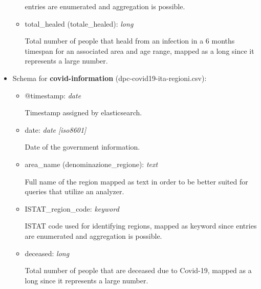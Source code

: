 \documentclass[12pt, a4paper]{article}
\begin{document}
\begin{itemize}
\begin{itemize}
\begin{footnotesize}
          entries are enumerated and aggregation is possible.
        \end{footnotesize}
      \item total\_healed (totale\_healed): \emph{long} \\
        \begin{footnotesize}
          Total number of people that heald from an infection in a 6 months timespan for
          an associated area and age range, mapped as a long since it represents a large 
          number.      
        \end{footnotesize}
    \end{itemize}
  \item Schema for \textbf{covid-information} (dpc-covid19-ita-regioni.csv):
    \begin{itemize}
      \item @timestamp: \emph{date} \\
        \begin{footnotesize}
          Timestamp assigned by elasticsearch.
        \end{footnotesize}
      \item date: \emph{date [iso8601]} \\
        \begin{footnotesize}
          Date of the government information.
        \end{footnotesize}
      \item area\_name (denominazione\_regione): \emph{text} \\
        \begin{footnotesize}
          Full name of the region mapped as text in order to be better suited for queries
          that utilize an analyzer.
        \end{footnotesize}
      \item ISTAT\_region\_code: \emph{keyword} \\
        \begin{footnotesize}
          ISTAT code used for identifying regions, mapped as keyword since entries are 
          enumerated and aggregation is possible.
        \end{footnotesize}
      \item deceased: \emph{long} \\
        \begin{footnotesize}
          Total number of people that are deceased due to Covid-19, mapped as a long 
          since it represents a large number.
        \end{footnotesize}

\end{itemize}
\end{itemize}
\end{document}
